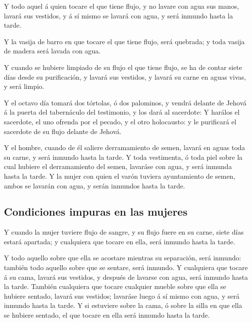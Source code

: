  Y todo aquel á quien tocare el que tiene flujo, y no
lavare con agua sus manos, lavará sus vestidos, y á sí mismo se lavará
con agua, y será inmundo hasta la tarde.

 Y la vasija de barro en que tocare el que tiene flujo,
será quebrada; y toda vasija de madera será lavada con agua.

 Y cuando se hubiere limpiado de su flujo el que tiene
flujo, se ha de contar siete días desde su purificación, y lavará sus
vestidos, y lavará su carne en aguas vivas, y será limpio.

 Y el octavo día tomará dos tórtolas, ó dos palominos, y
vendrá delante de Jehová á la puerta del tabernáculo del testimonio, y
los dará al sacerdote:  Y harálos el sacerdote, el uno
ofrenda por el pecado, y el otro holocausto: y le purificará el
sacerdote de su flujo delante de Jehová.

 Y el hombre, cuando de él saliere derramamiento de
semen, lavará en aguas toda su carne, y será inmundo hasta la tarde.
 Y toda vestimenta, ó toda piel sobre la cual hubiere el
derramamiento del semen, lavaráse con agua, y será inmunda hasta la
tarde.  Y la mujer con quien el varón tuviera
ayuntamiento de semen, ambos se lavarán con agua, y serán inmundos hasta
la tarde.

\hypertarget{condiciones-impuras-en-las-mujeres}{%
\subsection{Condiciones impuras en las
mujeres}\label{condiciones-impuras-en-las-mujeres}}

 Y cuando la mujer tuviere flujo de sangre, y su flujo
fuere en su carne, siete días estará apartada; y cualquiera que tocare
en ella, será inmundo hasta la tarde.

 Y todo aquello sobre que ella se acostare mientras su
separación, será inmundo: también todo aquello sobre que se sentare,
será inmundo.  Y cualquiera que tocare á su cama, lavará
sus vestidos, y después de lavarse con agua, será inmundo hasta la
tarde.  También cualquiera que tocare cualquier mueble
sobre que ella se hubiere sentado, lavará sus vestidos; lavaráse luego á
sí mismo con agua, y será inmundo hasta la tarde.  Y si
estuviere sobre la cama, ó sobre la silla en que ella se hubiere
sentado, el que tocare en ella será inmundo hasta la tarde.

